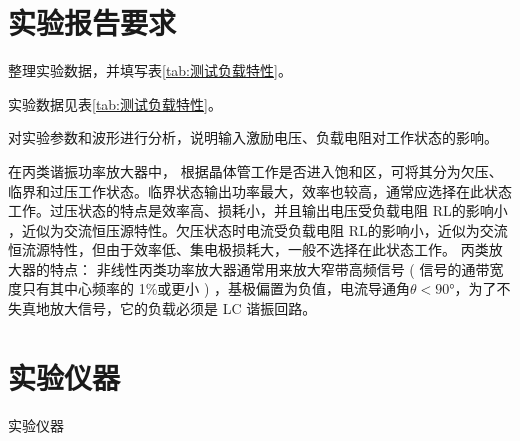 \documentclass[../main]{subfiles}
\begin{document}
\section{实验报告要求}%
\label{sec:\arabic{chapter}实验报告要求}

\begin{Exercise}

	整理实验数据，并填写表\ref{tab:测试负载特性}。

\end{Exercise}

\begin{Answer}

	实验数据见表\ref{tab:测试负载特性}。

\end{Answer}

\begin{Exercise}

	对实验参数和波形进行分析，说明输入激励电压、负载电阻对工作状态的影响。

\end{Exercise}

\begin{Answer}

	在丙类谐振功率放大器中， 根据晶体管工作是否进入饱和区，可将其分为欠压、
	临界和过压工作状态。临界状态输出功率最大，效率也较高，通常应选择在此状态
	工作。过压状态的特点是效率高、损耗小，并且输出电压受负载电阻 RL的影响小
	，近似为交流恒压源特性。欠压状态时电流受负载电阻 RL的影响小，近似为交流
	恒流源特性，但由于效率低、集电极损耗大，一般不选择在此状态工作。 丙类放
	大器的特点： 非线性丙类功率放大器通常用来放大窄带高频信号 ( 信号的通带宽
	度只有其中心频率的 1\%或更小 ) ，基极偏置为负值，电流导通角$ \theta <
	\ang{90;;} $，为了不失真地放大信号，它的负载必须是 LC 谐振回路。

\end{Answer}

\section{实验仪器}%
\label{sec:\arabic{chapter}实验仪器}

\begin{table}[htbp]
	\centering
	\caption{实验仪器}
	\label{tab:\arabic{chapter}实验仪器}
\end{table}
\end{document}
